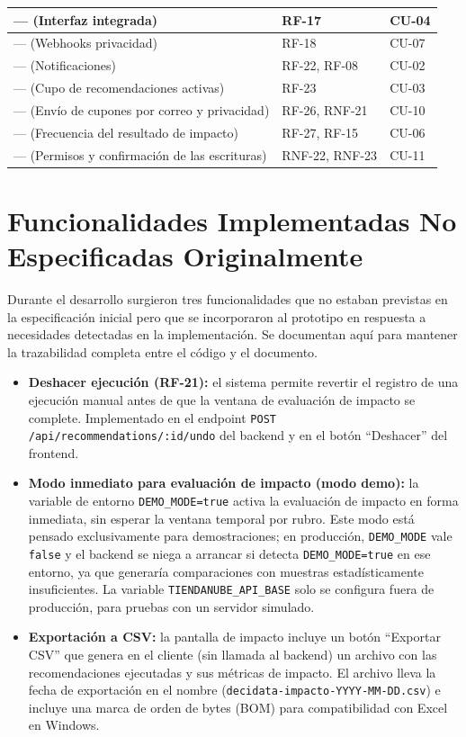 \begin{longtable}{|m{5.3cm}|m{5.4cm}|m{4.3cm}|}
\hline
--- (Interfaz integrada) & RF-17 & CU-04 \\
\hline
--- (Webhooks privacidad) & RF-18 & CU-07 \\
\hline
--- (Notificaciones) & RF-22, RF-08 & CU-02 \\
\hline
--- (Cupo de recomendaciones activas) & RF-23 & CU-03 \\
\hline
--- (Envío de cupones por correo y privacidad) & RF-26, RNF-21 & CU-10 \\
\hline
--- (Frecuencia del resultado de impacto) & RF-27, RF-15 & CU-06 \\
\hline
--- (Permisos y confirmación de las escrituras) & RNF-22, RNF-23 & CU-11 \\
\hline

\end{longtable}

\section{Funcionalidades Implementadas No Especificadas Originalmente}
\label{sec:funcionalidades-adicionales}

Durante el desarrollo surgieron tres funcionalidades que no estaban previstas en la especificación inicial pero que se incorporaron al prototipo en respuesta a necesidades detectadas en la implementación. Se documentan aquí para mantener la trazabilidad completa entre el código y el documento.

\begin{itemize}
    \item \textbf{Deshacer ejecución (RF-21):} el sistema permite revertir el registro de una ejecución manual antes de que la ventana de evaluación de impacto se complete. Implementado en el endpoint \texttt{POST /api/recommendations/:id/undo} del backend y en el botón \enquote{Deshacer} del frontend.

    \item \textbf{Modo inmediato para evaluación de impacto (modo demo):} la variable de entorno \texttt{DEMO\_MODE=true} activa la evaluación de impacto en forma inmediata, sin esperar la ventana temporal por rubro. Este modo está pensado exclusivamente para demostraciones; en producción, \texttt{DEMO\_MODE} vale \texttt{false} y el backend se niega a arrancar si detecta \texttt{DEMO\_MODE=true} en ese entorno, ya que generaría comparaciones con muestras estadísticamente insuficientes. La variable \texttt{TIENDANUBE\_API\_BASE} solo se configura fuera de producción, para pruebas con un servidor simulado.

    \item \textbf{Exportación a CSV:} la pantalla de impacto incluye un botón \enquote{Exportar CSV} que genera en el cliente (sin llamada al backend) un archivo con las recomendaciones ejecutadas y sus métricas de impacto. El archivo lleva la fecha de exportación en el nombre (\texttt{decidata-impacto-YYYY-MM-DD.csv}) e incluye una marca de orden de bytes (BOM) para compatibilidad con Excel en Windows.
\end{itemize}

